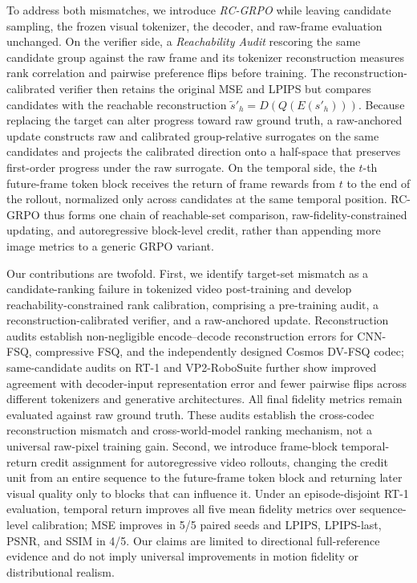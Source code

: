 \documentclass[letterpaper]{article} %
\begin{document}
To address both mismatches, we introduce \emph{RC-GRPO} while leaving candidate sampling, the frozen visual tokenizer, the decoder, and raw-frame evaluation unchanged. On the verifier side, a \emph{Reachability Audit} rescoring the same candidate group against the raw frame and its tokenizer reconstruction measures rank correlation and pairwise preference flips before training. The reconstruction-calibrated verifier then retains the original MSE and LPIPS but compares candidates with the reachable reconstruction $\tilde{s}'_h=D(Q(E(s'_h)))$. Because replacing the target can alter progress toward raw ground truth, a raw-anchored update constructs raw and calibrated group-relative surrogates on the same candidates and projects the calibrated direction onto a half-space that preserves first-order progress under the raw surrogate. On the temporal side, the $t$-th future-frame token block receives the return of frame rewards from $t$ to the end of the rollout, normalized only across candidates at the same temporal position. RC-GRPO thus forms one chain of reachable-set comparison, raw-fidelity-constrained updating, and autoregressive block-level credit, rather than appending more image metrics to a generic GRPO variant.

Our contributions are twofold. First, we identify target-set mismatch as a candidate-ranking failure in tokenized video post-training and develop reachability-constrained rank calibration, comprising a pre-training audit, a reconstruction-calibrated verifier, and a raw-anchored update. Reconstruction audits establish non-negligible encode--decode reconstruction errors for CNN-FSQ, compressive FSQ, and the independently designed Cosmos DV-FSQ codec; same-candidate audits on RT-1 and VP2-RoboSuite further show improved agreement with decoder-input representation error and fewer pairwise flips across different tokenizers and generative architectures. All final fidelity metrics remain evaluated against raw ground truth. These audits establish the cross-codec reconstruction mismatch and cross-world-model ranking mechanism, not a universal raw-pixel training gain. Second, we introduce frame-block temporal-return credit assignment for autoregressive video rollouts, changing the credit unit from an entire sequence to the future-frame token block and returning later visual quality only to blocks that can influence it. Under an episode-disjoint RT-1 evaluation, temporal return improves all five mean fidelity metrics over sequence-level calibration; MSE improves in 5/5 paired seeds and LPIPS, LPIPS-last, PSNR, and SSIM in 4/5. Our claims are limited to directional full-reference evidence and do not imply universal improvements in motion fidelity or distributional realism.
\end{document}
